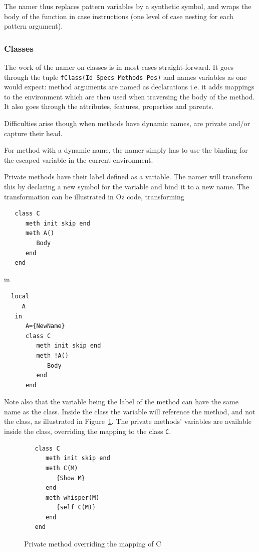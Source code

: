 \documentclass[a4paper]{memoir}
\begin{document}
The namer thus replaces pattern variables by a synthetic symbol, and wraps the body of the function in case instructions (one level of case nesting for each pattern argument). 




\subsubsection{Classes}\label{sec:arch:namer:classes}
The work of the namer on classes is in most cases straight-forward. It goes through the tuple
\lstinline!fClass(Id Specs Methods Pos)! and names variables as one would expect:
method arguments are named as declarations i.e. it adds mappings to the
environment which are then used when traversing the body of the method.
It also goes through the attributes, features, properties and parents.

Difficulties arise though when methods have dynamic names, are private and/or
capture their head.

For method with a dynamic name, the namer simply has to use the binding for the
escaped variable in the current environment.

Private methods have their label defined as a variable. The namer will transform this by 
declaring a new symbol for the variable and bind it to a new name.
The transformation can be illustrated in Oz code, transforming

\begin{lstlisting}
   class C
      meth init skip end
      meth A()
         Body
      end
   end
\end{lstlisting}

in

\begin{lstlisting}
  local
     A
   in
      A={NewName}
      class C
         meth init skip end
         meth !A()
            Body
         end
      end
\end{lstlisting}

Note also that the variable being the label of the method can have the same name
as the class. Inside the class the variable will reference the method, and not the class, 
as illustrated in Figure~\ref{fig:class_method_binding}. The private methods'
variables are available inside the class, overriding the mapping to the class
\lstinline!C!.
\begin{figure}[h]
\begin{lstlisting}
   class C
      meth init skip end
      meth C(M)
         {Show M}
      end
      meth whisper(M)
         {self C(M)}
      end
   end
\end{lstlisting}
\caption{Private method overriding the mapping of C}
\label{fig:class_method_binding}
\end{figure}
\end{document}
